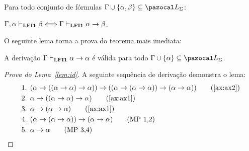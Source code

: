         
        \begin{teorema}\label{teo:deducao}
            Para todo conjunto de fórmulas $\Gamma \cup \{\alpha, \beta \} \subseteq \ling{}$:

            \centering
            {\normalfont{} $\Gamma, \alpha \vdash_{{\normalfont\textbf{LFI1}}{}} \beta \Longleftrightarrow \Gamma \vdash_{{\normalfont\textbf{LFI1}}{}} \alpha \to \beta$.}
        \end{teorema}

        O seguinte lema torna a prova do teorema mais imediata:
        \begin{lema}\label{lem:id}
            A derivação $\Gamma \vdash_{{\normalfont\textbf{LFI1}}{}} \alpha \to \alpha$ é válida para todo $\Gamma \cup \{\alpha\} \subseteq \ling{}$.
        \end{lema}
        
        \begin{proof}[Prova do Lema~\ref{lem:id}]
            A seguinte sequência de derivação demonstra o lema:
            \begin{align*}
                & \text{1. } (\alpha \to ((\alpha \to \alpha) \to \alpha)) \to ((\alpha \to (\alpha \to \alpha)) \to (\alpha \to \alpha))\tag{\ref{ax:ax2}}\\
                & \text{2. } \alpha \to ((\alpha \to \alpha) \to \alpha)\tag{\ref{ax:ax1}}\\
                & \text{3. } \alpha \to (\alpha \to \alpha)\tag{\ref{ax:ax1}}\\
                & \text{4. } (\alpha \to (\alpha \to \alpha)) \to (\alpha \to \alpha)\tag{MP 1,2}\\
                & \text{5. } \alpha \to \alpha\tag{MP 3,4}
            \end{align*}
        \end{proof}

